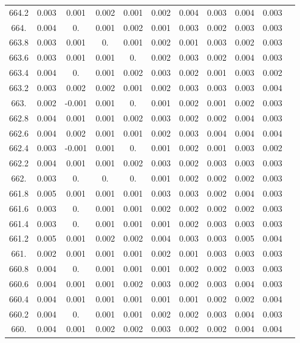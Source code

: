 \documentclass[12pt]{ctexart}
\numberwithin{equation}{section}
\begin{document}
\begin{longtable}{ccccccccccc}
664.2	&	0.003	&	0.001	&	0.002	&	0.001	&	0.002	&	0.004	&	0.003	&	0.004	&	0.003	\\
664.	&	0.004	&	0.	&	0.001	&	0.002	&	0.001	&	0.003	&	0.002	&	0.003	&	0.003	\\
663.8	&	0.003	&	0.001	&	0.	&	0.001	&	0.002	&	0.001	&	0.003	&	0.002	&	0.003	\\
663.6	&	0.003	&	0.001	&	0.001	&	0.	&	0.002	&	0.003	&	0.002	&	0.004	&	0.003	\\
663.4	&	0.004	&	0.	&	0.001	&	0.002	&	0.003	&	0.002	&	0.001	&	0.003	&	0.002	\\
663.2	&	0.003	&	0.002	&	0.002	&	0.001	&	0.002	&	0.003	&	0.003	&	0.003	&	0.004	\\
663.	&	0.002	&	-0.001	&	0.001	&	0.	&	0.001	&	0.002	&	0.001	&	0.002	&	0.003	\\
662.8	&	0.004	&	0.001	&	0.001	&	0.002	&	0.003	&	0.002	&	0.002	&	0.004	&	0.003	\\
662.6	&	0.004	&	0.002	&	0.001	&	0.001	&	0.002	&	0.003	&	0.004	&	0.004	&	0.004	\\
662.4	&	0.003	&	-0.001	&	0.001	&	0.	&	0.001	&	0.002	&	0.001	&	0.003	&	0.002	\\
662.2	&	0.004	&	0.001	&	0.001	&	0.002	&	0.003	&	0.002	&	0.003	&	0.003	&	0.003	\\
662.	&	0.003	&	0.	&	0.	&	0.	&	0.001	&	0.002	&	0.002	&	0.002	&	0.003	\\
661.8	&	0.005	&	0.001	&	0.001	&	0.001	&	0.003	&	0.003	&	0.002	&	0.004	&	0.003	\\
661.6	&	0.003	&	0.	&	0.001	&	0.001	&	0.002	&	0.002	&	0.002	&	0.002	&	0.003	\\
661.4	&	0.003	&	0.	&	0.001	&	0.001	&	0.001	&	0.002	&	0.003	&	0.003	&	0.003	\\
661.2	&	0.005	&	0.001	&	0.002	&	0.002	&	0.004	&	0.003	&	0.003	&	0.005	&	0.004	\\
661.	&	0.002	&	0.001	&	0.001	&	0.001	&	0.002	&	0.001	&	0.003	&	0.003	&	0.003	\\
660.8	&	0.004	&	0.	&	0.001	&	0.001	&	0.001	&	0.002	&	0.002	&	0.003	&	0.003	\\
660.6	&	0.004	&	0.001	&	0.001	&	0.002	&	0.003	&	0.002	&	0.003	&	0.004	&	0.003	\\
660.4	&	0.004	&	0.001	&	0.001	&	0.001	&	0.001	&	0.001	&	0.002	&	0.002	&	0.004	\\
660.2	&	0.004	&	0.	&	0.001	&	0.001	&	0.002	&	0.002	&	0.003	&	0.004	&	0.003	\\
660.	&	0.004	&	0.001	&	0.002	&	0.002	&	0.003	&	0.002	&	0.002	&	0.004	&	0.004	\\

\end{longtable}
\end{document}
